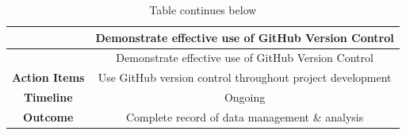 \documentclass[]{elsarticle} %
\begin{document}
\begin{longtable}[]{@{}cc@{}}
\caption{Table continues below}\tabularnewline
\toprule
\begin{minipage}[b]{0.25\columnwidth}\centering\strut
~\strut
\end{minipage} & \begin{minipage}[b]{0.42\columnwidth}\centering\strut
Demonstrate effective use of GitHub Version Control\strut
\end{minipage}\tabularnewline
\midrule
\endfirsthead
\toprule
\begin{minipage}[b]{0.25\columnwidth}\centering\strut
~\strut
\end{minipage} & \begin{minipage}[b]{0.42\columnwidth}\centering\strut
Demonstrate effective use of GitHub Version Control\strut
\end{minipage}\tabularnewline
\midrule
\endhead
\begin{minipage}[t]{0.25\columnwidth}\centering\strut
\textbf{Action Items}\strut
\end{minipage} & \begin{minipage}[t]{0.42\columnwidth}\centering\strut
Use GitHub version control throughout project development\strut
\end{minipage}\tabularnewline
\begin{minipage}[t]{0.25\columnwidth}\centering\strut
\textbf{Timeline}\strut
\end{minipage} & \begin{minipage}[t]{0.42\columnwidth}\centering\strut
Ongoing\strut
\end{minipage}\tabularnewline
\begin{minipage}[t]{0.25\columnwidth}\centering\strut
\textbf{Outcome}\strut
\end{minipage} & \begin{minipage}[t]{0.42\columnwidth}\centering\strut
Complete record of data management \& analysis\strut
\end{minipage}\tabularnewline
\bottomrule
\end{longtable}
\end{document}
